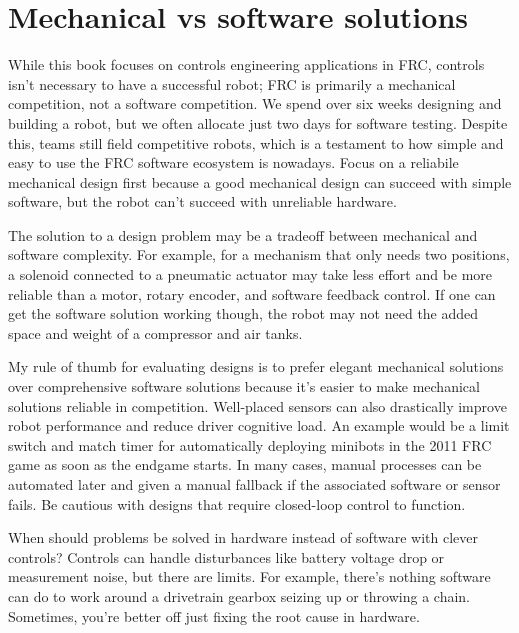 \section{Mechanical vs software solutions}

While this book focuses on controls engineering applications in FRC, controls
isn't necessary to have a successful robot; FRC is primarily a mechanical
competition, not a software competition. We spend over six weeks designing and
building a robot, but we often allocate just two days for software testing.
Despite this, teams still field competitive robots, which is a testament to how
simple and easy to use the FRC software ecosystem is nowadays. Focus on a
reliabile mechanical design first because a good mechanical design can succeed
with simple software, but the robot can't succeed with unreliable hardware.

The solution to a design problem may be a tradeoff between mechanical and
software complexity. For example, for a mechanism that only needs two positions,
a solenoid connected to a pneumatic actuator may take less effort and be more
reliable than a motor, rotary encoder, and software feedback control. If one can
get the software solution working though, the robot may not need the added space
and weight of a compressor and air tanks.

My rule of thumb for evaluating designs is to prefer elegant mechanical
solutions over comprehensive software solutions because it's easier to make
mechanical solutions reliable in competition. Well-placed sensors can also
drastically improve robot performance and reduce driver cognitive load. An
example would be a limit switch and match timer for automatically deploying
minibots in the 2011 FRC game as soon as the endgame starts. In many cases,
manual processes can be automated later and given a manual fallback if the
associated software or sensor fails. Be cautious with designs that require
closed-loop control to function.

When should problems be solved in hardware instead of software with clever
controls? Controls can handle disturbances like battery voltage drop or
measurement noise, but there are limits. For example, there's nothing software
can do to work around a drivetrain gearbox seizing up or throwing a chain.
Sometimes, you're better off just fixing the root cause in hardware.

